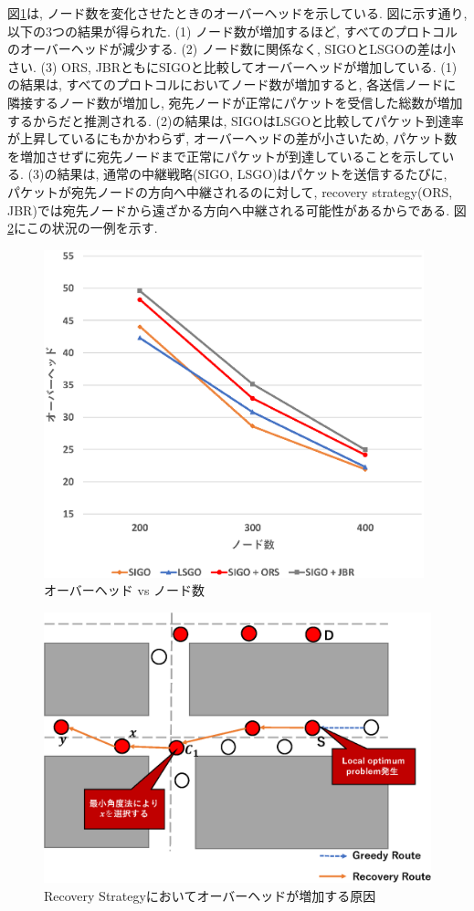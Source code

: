 \documentclass[10pt]{jreport}
\begin{document}
図\ref{fig:SIGO_overhead}は, ノード数を変化させたときのオーバーヘッドを示している.
図に示す通り, 以下の3つの結果が得られた.
(1) ノード数が増加するほど, すべてのプロトコルのオーバーヘッドが減少する.
(2) ノード数に関係なく, SIGOとLSGOの差は小さい. 
(3) ORS, JBRともにSIGOと比較してオーバーヘッドが増加している. 
(1)の結果は, すべてのプロトコルにおいてノード数が増加すると, 各送信ノードに隣接するノード数が増加し, 宛先ノードが正常にパケットを受信した総数が増加するからだと推測される.
(2)の結果は, SIGOはLSGOと比較してパケット到達率が上昇しているにもかかわらず, オーバーヘッドの差が小さいため, パケット数を増加させずに宛先ノードまで正常にパケットが到達していることを示している. 
(3)の結果は, 通常の中継戦略(SIGO, LSGO)はパケットを送信するたびに,　パケットが宛先ノードの方向へ中継されるのに対して, recovery strategy(ORS, JBR)では宛先ノードから遠ざかる方向へ中継される可能性があるからである.
図\ref{fig:Recocvery_overhead_reason}にこの状況の一例を示す.

\begin{figure}[!ht]
	\centering
	\includegraphics[width=110mm]{figures/SIGO_overhead_num.eps}
	\caption{オーバーヘッド vs ノード数}
	\label{fig:SIGO_overhead}
\end{figure}

\begin{figure}[!ht]
	\centering
	\includegraphics[width=120mm]{figures/Recovery_overhead_reason.eps}
	\caption{Recovery Strategyにおいてオーバーヘッドが増加する原因}
	\label{fig:Recocvery_overhead_reason}
\end{figure}
\end{document}
